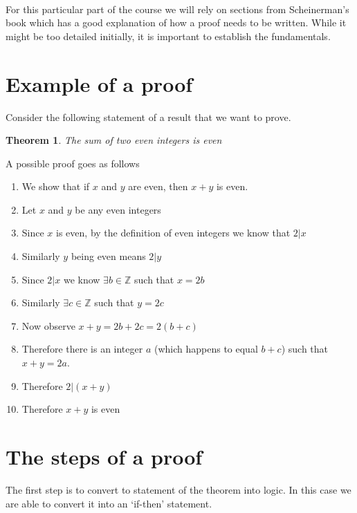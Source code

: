 \documentclass[12pt]{article}
\newtheorem{theorem}{Theorem}
\begin{document}
\begin{center}
\\
\vspace{1cm}
\end{center}

\vspace{0.5cm}\noindent

For this particular part of the course we will rely on sections from Scheinerman's book which has a good explanation of how a proof needs to be written. While it might be too detailed initially, it is important to establish the fundamentals.

\section*{Example of a proof}
Consider the following statement of a result that we want to prove.

\begin{theorem}
The sum of two even integers is even
\end{theorem}

A possible proof goes as follows

\begin{enumerate}
\item We show that if $x$ and $y$ are even, then $x + y$ is even.
\item Let $x$ and $y$ be any even integers
\item Since $x$ is even, by the definition of even integers we know that $2|x$
\item Similarly $y$ being even means $2|y$
\item Since $2|x$ we know $\exists b \in \mathbb{Z}$ such that $x=2b$
\item Similarly $\exists c \in \mathbb{Z}$ such that $y=2c$
\item Now observe $x + y = 2b + 2c = 2(b+c)$
\item Therefore there is an integer $a$ (which happens to equal $b + c$) such that $x + y = 2a$. 
\item Therefore $2|(x + y)$
\item Therefore $x + y$ is even
\end{enumerate}


\section*{The steps of a proof}
The first step is to convert to statement of the theorem into logic. In this case we are able to convert it into an `if-then' statement. 
\end{document}
